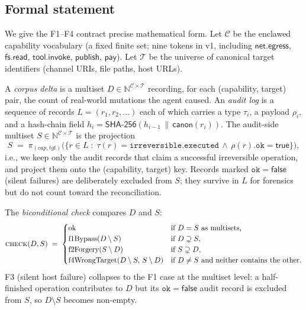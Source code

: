 \documentclass[11pt]{article}
\begin{document}
\subsection{Formal statement}

We give the F1--F4 contract precise mathematical form. Let
$\mathcal{C}$ be the enclawed capability vocabulary (a fixed finite
set; nine tokens in v1, including $\textsf{net.egress}$, $\textsf{fs.read}$,
$\textsf{tool.invoke}$, $\textsf{publish}$, $\textsf{pay}$). Let
$\mathcal{T}$ be the universe of canonical target identifiers
(channel URIs, file paths, host URLs).

A \emph{corpus delta} is a multiset $D \in \mathbb{N}^{\mathcal{C}\times\mathcal{T}}$
recording, for each (capability, target) pair, the count of real-world
mutations the agent caused. An \emph{audit log} is a sequence of
records $L = (r_1, r_2, \ldots)$ each of which carries a type
$\tau_i$, a payload $\rho_i$, and a hash-chain field
$h_i = \mathsf{SHA\text{-}256}(h_{i-1} \,\|\, \mathsf{canon}(r_i))$.
The audit-side multiset $S \in \mathbb{N}^{\mathcal{C}\times\mathcal{T}}$
is the projection
\begin{equation}
S \;=\; \pi_{(\mathit{cap},\mathit{tgt})}\!\bigl(
  \{ r \in L \;:\; \tau(r) = \texttt{irreversible.executed} \,\wedge\, \rho(r).\texttt{ok} = \mathsf{true} \}
\bigr),
\label{eq:S-projection}
\end{equation}
i.e., we keep only the audit records that claim a successful
irreversible operation, and project them onto the (capability,
target) key. Records marked $\texttt{ok}=\mathsf{false}$ (silent
failures) are deliberately excluded from $S$; they survive in $L$
for forensics but do not count toward the reconciliation.

The \emph{biconditional check} compares $D$ and $S$:
\begin{equation}
\textsc{check}(D, S) \;=\;
\begin{cases}
\mathrm{ok} & \text{if } D = S \text{ as multisets,} \\
\mathrm{f1Bypass}(D \setminus S) & \text{if } D \supsetneq S, \\
\mathrm{f2Forgery}(S \setminus D) & \text{if } S \supsetneq D, \\
\mathrm{f4WrongTarget}(D \setminus S,\, S \setminus D) & \text{if } D \neq S \text{ and neither contains the other.}
\end{cases}
\label{eq:check}
\end{equation}
F3 (silent host failure) collapses to the F1 case at the multiset
level: a half-finished operation contributes to $D$ but its
$\texttt{ok}=\mathsf{false}$ audit record is excluded from $S$, so
$D \setminus S$ becomes non-empty.
\end{document}
